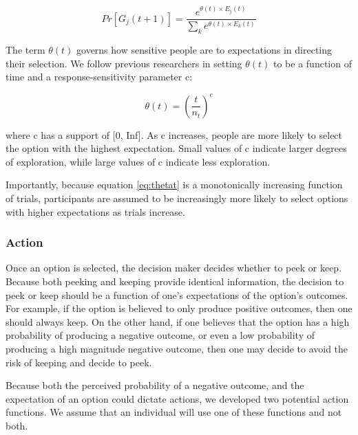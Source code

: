 \documentclass[a4paper,doc,natbib,floatsintext]{apa6}\usepackage[]{graphicx}\usepackage[]{color}
\begin{document}
\begin{center}
\begin{equation}

Pr[G_{j}(t+1)]=\frac{e^{\theta(t) \times E_{j}(t)}}{\sum_{k}e^{\theta(t) \times E_{k}(t)}}

\end{equation}
\end{center}

The term $\theta(t)$ governs how sensitive people are to expectations in directing their selection. We follow previous researchers \citep{yechiam2005models} in setting $\theta(t)$ to be a function of time and a response-sensitivity parameter c:

\begin{center}
\begin{equation}
\label{eq:thetat}

\theta(t) = (\frac{t}{n_{t}})^{c}

\end{equation}
\end{center}

where c has a support of [0, Inf]. As c increases, people are more likely to select the option with the highest expectation. Small values of c indicate larger degrees of exploration, while large values of c indicate less exploration.

Importantly, because equation \ref{eq:thetat} is a monotonically increasing function of trials, participants are assumed to be increasingly more likely to select options with higher expectations as trials increase.

\subsubsection{Action}

Once an option is selected, the decision maker decides whether to peek or keep. Because both peeking and keeping provide identical information, the decision to peek or keep should be a function of one's expectations of the option's outcomes. For example, if the option is believed to only produce positive outcomes, then one should always keep. On the other hand, if one believes that the option has a high probability of producing a negative outcome, or even a low probability of producing a high magnitude negative outcome, then one may decide to avoid the risk of keeping and decide to peek.

Because both the perceived probability of a negative outcome, and the expectation of an option could dictate actions, we developed two potential action functions. We assume that an individual will use one of these functions and not both.
\end{document}
